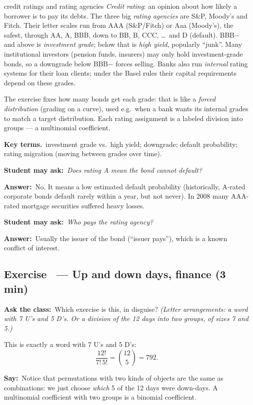 \documentclass[11pt,a4paper,parskip=half]{scrartcl}
\newcommand{\terms}{\par\textbf{\color{plum}Key terms.}\ }
\newcommand{\sq}[1]{\par\textbf{\color{plum}Student may ask:}\ \emph{#1}\par}
\newcommand{\ans}{\textbf{Answer:}\ }
\newcommand{\say}{\textbf{\color{teal}Say:}\ }
\newcommand{\ask}{\textbf{\color{navy}Ask the class:}\ }
\newcommand{\slide}[1]{\marginpar{\raggedright\footnotesize\color{gray}slide #1}}
\begin{document}
\begin{bg}{credit ratings and rating agencies}
	\emph{Credit rating}: an opinion about how likely a borrower is to pay its
	debts. The three big \emph{rating agencies} are S\&P, Moody's and Fitch.
	Their letter scales run from AAA (S\&P/Fitch) or Aaa (Moody's), the
	safest, through AA, A, BBB, down to BB, B, CCC, \ldots\ and D (default).
	BBB$-$ and above is \emph{investment grade}; below that is \emph{high
		yield}, popularly ``junk''. Many institutional investors (pension funds,
	insurers) may only hold investment-grade bonds, so a downgrade below BBB$-$
	forces selling. Banks also run \emph{internal} rating systems for their
	loan clients; under the Basel rules their capital requirements depend on
	these grades.

	The exercise fixes how many bonds get each grade: that is like a
	\emph{forced distribution} (grading on a curve), used e.g.\ when a bank
	wants its internal grades to match a target distribution. Each rating
	assignment is a labeled division into groups --- a multinomial
	coefficient.

	\terms investment grade vs.\ high yield; downgrade; default probability;
	rating migration (moving between grades over time).

	\sq{Does rating A mean the bond cannot default?}
	\ans No. It means a low estimated default probability (historically,
	A-rated corporate bonds default rarely within a year, but not never). In
	2008 many AAA-rated mortgage securities suffered heavy losses.

	\sq{Who pays the rating agency?}
	\ans Usually the issuer of the bond (``issuer pays''), which is a known
	conflict of interest.
\end{bg}

\subsection{Exercise~ --- Up and down days, finance (3 min)}\slide{13}


\ask Which exercise is this, in disguise? \emph{(Letter arrangements: a
	word with 7 U's and 5 D's. Or a division of the 12 days into two groups, of
	sizes 7 and 5.)}

This is exactly a word with 7 U's and 5 D's:
\[ \frac{12!}{7!\,5!} = \binom{12}{5} = 792. \]

\say Notice that permutations with two kinds of objects are the same as
combinations: we just choose \emph{which} 5 of the 12 days were down-days.
A multinomial coefficient with two groups is a binomial coefficient.
\end{document}
